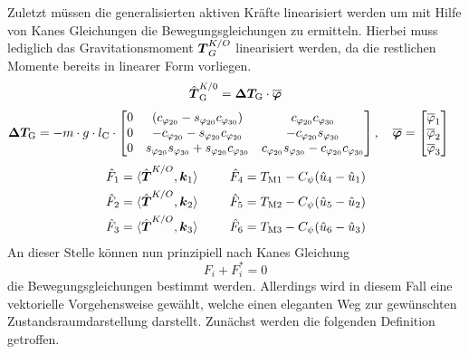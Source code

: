 Zuletzt müssen die generalisierten aktiven Kräfte linearisiert werden um mit Hilfe von Kanes Gleichungen die Bewegungsgleichungen zu ermitteln. Hierbei muss lediglich das Gravitationsmoment $\boldsymbol{T}^{K/O}_G$ linearisiert werden, da die restlichen Momente bereits in linearer Form vorliegen.
\begin{align}
\hat{\boldsymbol{T}}^{K/0}_{\text{G}} = \boldsymbol{\Delta T_{\text{G}}} \cdot \boldsymbol{\overline{\varphi}}
\end{align}
\begin{align*}
\boldsymbol{\Delta T_{\text{G}}} = -m\cdot g\cdot l_{\text{C}}\cdot \begin{bmatrix}
0 & (c_{\varphi_{\text{20}}}-s_{\varphi_{\text{20}}}c_{\varphi_{\text{30}}}) & c_{\varphi_{\text{20}}}c_{\varphi_{\text{30}}} 
\\
0 & -c_{\varphi_{\text{20}}}-s_{\varphi_{\text{20}}}c_{\varphi_{\text{20}}} & -c_{\varphi_{\text{20}}}s_{\varphi_{\text{30}}} 
\\
0 & s_{\varphi_{\text{20}}}s_{\varphi_{\text{30}}}+s_{\varphi_{\text{20}}}c_{\varphi_{\text{30}}} & c_{\varphi_{\text{20}}}s_{\varphi_{\text{30}}}-c_{\varphi_{\text{20}}}c_{\varphi_{\text{30}}}
\end{bmatrix},\hspace{10pt}
\boldsymbol{\overline{\varphi}}&= \begin{bmatrix}
\overline{\varphi}_{\text{1}} \\ \overline{\varphi}_{\text{2}} \\ \overline{\varphi}_{\text{3}}
\end{bmatrix} \nonumber
\end{align*}
\begin{align}
\hat{F}_1 &= \langle {\hat{\boldsymbol{T}}^{K/O}}, {\boldsymbol{k}_{\text{1}}} \rangle &&\hspace{15pt}\hat{F}_{\text{4}} = T_{\text{M1}} - C_{\psi}(\hat{u}_{\text{4}} - \hat{u}_{\text{1}})
\\
\hat{F}_{\text{2}} &= \langle {\hat{\boldsymbol{T}}^{K/O}}, {\boldsymbol{k}_{\text{2}}} \rangle &&\hspace{15pt}\hat{F}_{\text{5}} = T_{\text{M2}} - C_{\psi}(\hat{u}_{\text{5}} - \hat{u}_{\text{2}})
\\
\hat{F}_{\text{3}} &= \langle {\hat{\boldsymbol{T}}^{K/O}}, {\boldsymbol{k}_{\text{3}}} \rangle &&\hspace{15pt}\hat{F}_{\text{6}} = T_{\text{M3}} - C_{\psi}(\hat{u}_{\text{6}} - \hat{u}_{\text{3}})
\end{align}
An dieser Stelle können nun prinzipiell nach Kanes Gleichung
\begin{equation}
F_i + F^*_i = 0
\end{equation}
die Bewegungsgleichungen bestimmt werden. Allerdings wird in diesem Fall eine vektorielle Vorgehensweise gewählt, welche einen eleganten Weg zur gewünschten Zustandsraumdarstellung darstellt. Zunächst werden die folgenden Definition getroffen.
